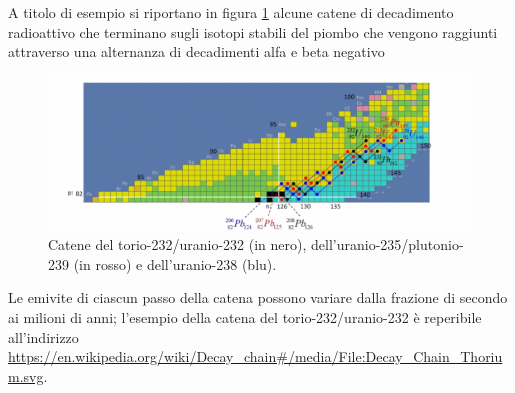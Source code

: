 A titolo di esempio si riportano in figura \ref{fig:decay-chain1} alcune catene di decadimento radioattivo che terminano sugli
isotopi stabili del piombo che vengono raggiunti attraverso una alternanza di decadimenti alfa e beta negativo

\begin{figure}
    \centering
    \includegraphics{../figs/decay-chain1}
    \caption{Catene del torio-232/uranio-232 (in nero), dell’uranio-235/plutonio-239 (in rosso) e dell’uranio-238 (blu).}
    \label{fig:decay-chain1}
\end{figure}

Le emivite di ciascun passo della catena possono variare dalla frazione di secondo ai milioni di anni;
l’esempio della catena del torio-232/uranio-232 è reperibile all'indirizzo
\url{https://en.wikipedia.org/wiki/Decay_chain#/media/File:Decay_Chain_Thorium.svg}.